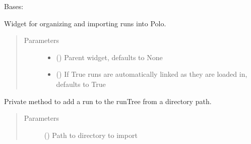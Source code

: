 \documentclass[letterpaper,10pt,english]{sphinxmanual}
\begin{document}
\begin{fulllineitems}
\label{\detokenize{polo.widgets:polo.widgets.run_organizer.RunOrganizer}}
Bases: 

Widget for organizing and importing runs into Polo.
\begin{quote}\begin{description}
\item[{Parameters}] \leavevmode\begin{itemize}
\item {} 
 (\sphinxstyleliteralemphasis{\sphinxupquote{, }}) \textendash{} Parent widget, defaults to None

\item {} 
 (\sphinxstyleliteralemphasis{\sphinxupquote{, }}) \textendash{} If True runs are automatically
linked as they are loaded in, defaults to True

\end{itemize}

\end{description}\end{quote}

\begin{fulllineitems}
\label{\detokenize{polo.widgets:polo.widgets.run_organizer.RunOrganizer._add_run_from_directory}}
Private method to add a run to the runTree from a directory path.
\begin{quote}\begin{description}
\item[{Parameters}] \leavevmode
{} () \textendash{} Path to directory to import


\end{description}
\end{quote}
\end{fulllineitems}
\end{fulllineitems}
\end{document}
